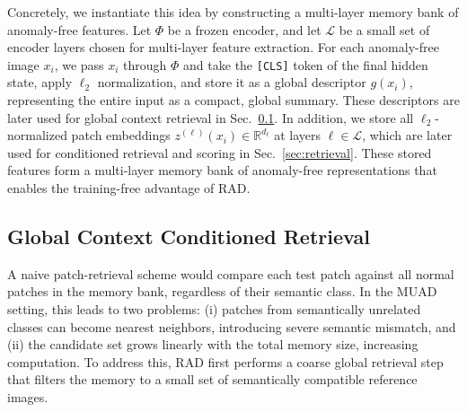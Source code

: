 \documentclass{article}
\theoremstyle{plain}
\theoremstyle{definition}
\theoremstyle{remark}
\begin{document}
Concretely, we instantiate this idea by constructing a multi-layer memory bank of anomaly-free features.
Let $\Phi$ be a frozen encoder, and let $\mathcal{L}$ be a small set of encoder layers chosen for multi-layer feature extraction. For each anomaly-free image $x_i$, we pass $x_i$ through $\Phi$ and take the \texttt{[CLS]} token of the final hidden state, apply $\ell_2$ normalization, and  store it as a global descriptor $g(x_i)$, representing the entire input as a compact, global summary. These descriptors are later used for global context retrieval in Sec.~\ref{sec:cls-retrieval-subsec}.
In addition, we store all $\ell_2$-normalized patch embeddings $z^{(\ell)}(x_i) \in \mathbb{R}^{d_\ell}$ at layers $\ell \in \mathcal{L}$, which are later used for conditioned retrieval and scoring in Sec.~\ref{sec:retrieval}.
These stored features form a multi-layer memory bank of anomaly-free representations that enables the training-free advantage of RAD.

\subsection{Global Context Conditioned Retrieval}
\label{sec:cls-retrieval-subsec}
A naive patch-retrieval scheme would compare each test patch against all normal patches in the memory bank, regardless of their semantic class. In the MUAD setting, this leads to two problems: (i) patches from semantically unrelated classes can become nearest neighbors, introducing severe semantic mismatch, and (ii) the candidate set grows linearly with the total memory size, increasing computation. To address this, RAD first performs a coarse global retrieval step that filters the memory to a small set of semantically compatible reference images.
\end{document}
